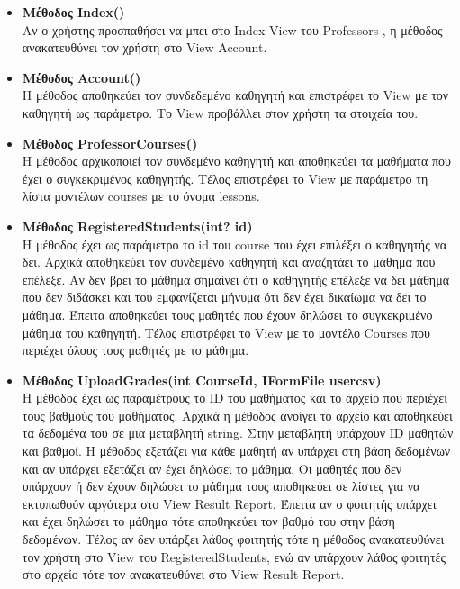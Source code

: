 \documentclass[12pt]{article}
\begin{document}
\begin{itemize}
	
	\item \textbf{Μέθοδος Index()}\\
	Αν ο χρήστης προσπαθήσει να μπει στο Index View του Professors , η μέθοδος ανακατευθύνει τον χρήστη στο View Account.		
	
	\item \textbf{Μέθοδος Account()}\\
	Η μέθοδος αποθηκεύει τον συνδεδεμένο καθηγητή και επιστρέφει το View με τον καθηγητή ως παράμετρο. Το View προβάλλει στον χρήστη τα στοιχεία του.		
	
	\item \textbf{Μέθοδος ProfessorCourses()}\\
	Η μέθοδος αρχικοποιεί τον συνδεμένο καθηγητή και αποθηκεύει τα μαθήματα που έχει ο συγκεκριμένος καθηγητής. Τέλος επιστρέφει το View με παράμετρο τη λίστα μοντέλων courses με το όνομα lessons.		
	
	\item \textbf{Μέθοδος RegisteredStudents(int? id)}\\
	Η μέθοδος έχει ως παράμετρο το id του course που έχει επιλέξει ο καθηγητής να δει. Αρχικά αποθηκεύει τον συνδεμένο καθηγητή και αναζητάει το μάθημα που επέλεξε. Αν δεν βρει το μάθημα σημαίνει ότι ο καθηγητής επέλεξε να δει μάθημα που δεν διδάσκει και του εμφανίζεται μήνυμα ότι δεν έχει δικαίωμα να δει το μάθημα. Έπειτα αποθηκεύει τους μαθητές που έχουν δηλώσει το συγκεκριμένο μάθημα του καθηγητή. Τέλος επιστρέφει το View με το  μοντέλο Courses που περιέχει όλους τους μαθητές με το μάθημα.

	\item \textbf{Μέθοδος UploadGrades(int CourseId, IFormFile usercsv)}\\
	Η μέθοδος έχει ως παραμέτρους το ID του μαθήματος και το αρχείο που περιέχει τους βαθμούς του μαθήματος. Αρχικά η μέθοδος ανοίγει το αρχείο και αποθηκεύει  τα δεδομένα του σε μια μεταβλητή string. Στην μεταβλητή υπάρχουν ID μαθητών και βαθμοί. Η μέθοδος εξετάζει για κάθε μαθητή αν υπάρχει στη βάση δεδομένων και αν υπάρχει εξετάζει αν έχει δηλώσει το μάθημα. Οι μαθητές που δεν υπάρχουν ή δεν έχουν δηλώσει το μάθημα τους αποθηκεύει σε λίστες για να εκτυπωθούν αργότερα στο View Result Report. Έπειτα αν ο φοιτητής υπάρχει και έχει δηλώσει το μάθημα τότε αποθηκεύει τον βαθμό του στην βάση δεδομένων. Τέλος αν δεν υπάρξει λάθος φοιτητής τότε η μέθοδος ανακατευθύνει τον χρήστη στο View του RegisteredStudents, ενώ αν υπάρχουν λάθος φοιτητές στο αρχείο τότε τον ανακατευθύνει στο View Result Report.


\end{itemize}
\end{document}
